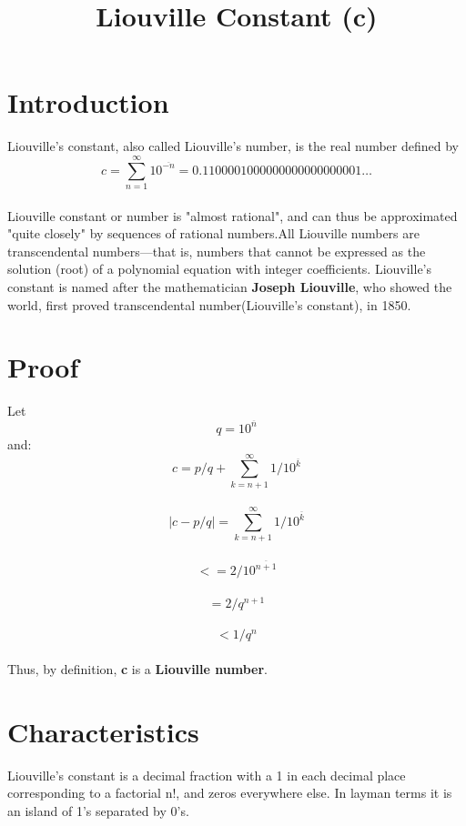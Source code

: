 \documentclass[11pt letterpaper]{article}
\newcommand{\risingfactorial}[1]{%
  ^{\overline{#1}}%
}
\begin{document}
\title{\textbf{Liouville Constant (c)}}
\maketitle
\section{Introduction}
Liouville's constant, also called Liouville's number, is the real number defined by\\ 
$$c=\sum_{n=1}^\infty 10\risingfactorial{-n}=0.1100001000000000000000001…$$\\
Liouville constant or number is "almost rational", and can thus be approximated "quite closely" by sequences of rational numbers.All Liouville numbers are transcendental numbers—that is, numbers that cannot be expressed as the solution (root) of a polynomial equation with integer coefficients. Liouville's constant is named after the mathematician \textbf{Joseph Liouville}, who showed the world, first proved  transcendental number(Liouville’s constant), in 1850.

\section{Proof}
Let $$q=10\risingfactorial{n}$$ and:\\
$$c=p/q+\sum_{k=n+1}^\infty1/10\risingfactorial{k}$$\\
$$\mid c-p/q \mid=\sum_{k=n+1}^\infty1/10\risingfactorial{k}$$\\
$$<=2/10\risingfactorial{n+1}$$\\
$$=2/q^{n+1}$$\\
$$<1/q^{n}$$\\
Thus, by definition, \textbf{c} is a \textbf{Liouville number}. 
 
\section{Characteristics}
Liouville's constant is a decimal fraction with a 1 in each decimal place corresponding to a factorial n!, and zeros everywhere else. In layman terms it is an island of 1's separated by 0’s.
\end{document}
